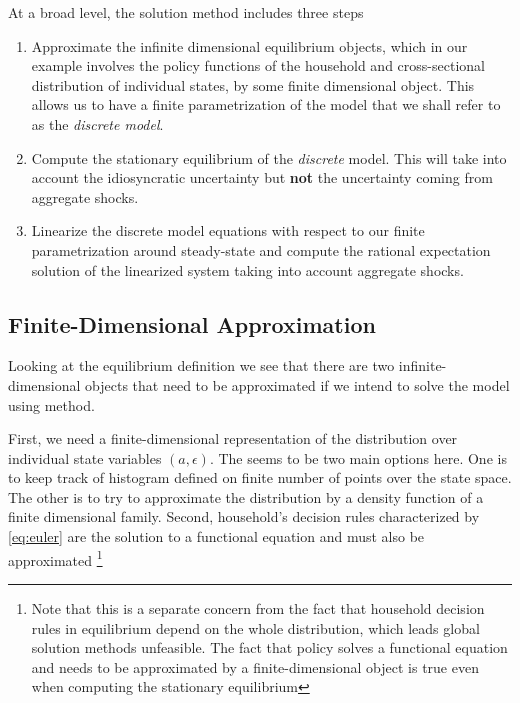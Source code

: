 \documentclass[a4paper,10pt]{article}  %
\begin{document}
At a broad level, the solution method includes three steps
\begin{enumerate}
   \item Approximate the infinite dimensional equilibrium objects, which in our example involves the
         policy functions of the household and cross-sectional distribution of individual states, by some
         finite dimensional object. This allows us to have a finite parametrization of the model that we
         shall refer to as the \emph{discrete model}.

   \item Compute the stationary equilibrium of the \emph{discrete} model. This will take into account
         the idiosyncratic uncertainty but \textbf{not} the uncertainty coming from aggregate shocks.

   \item Linearize the discrete model equations with respect to our finite parametrization around
         steady-state and compute the rational expectation solution of the linearized system taking into
         account aggregate shocks.
\end{enumerate}

\subsection{Finite-Dimensional Approximation} %
\label{sub:finite_dimensional_approximation}
Looking at the equilibrium definition we see that there are two infinite-dimensional objects that need to be approximated if we intend
to solve the model using \citet{reiter} method.

First, we need a finite-dimensional representation of the distribution over individual state variables $(a,\epsilon)$. The seems to be
two main options here. One is to keep track of histogram defined on finite number of points over the state space. The other is to try
to approximate the distribution by a density function of a finite dimensional family. Second, household's decision rules characterized
by \eqref{eq:euler} are the solution to a functional equation and must also be approximated%
\footnote{Note that this is a separate concern from the fact that household decision rules in equilibrium depend on the whole
distribution, which leads global solution methods unfeasible. The fact that policy solves a functional equation and needs to be approximated 
by a finite-dimensional object is true even when computing the stationary equilibrium}
\end{document}
